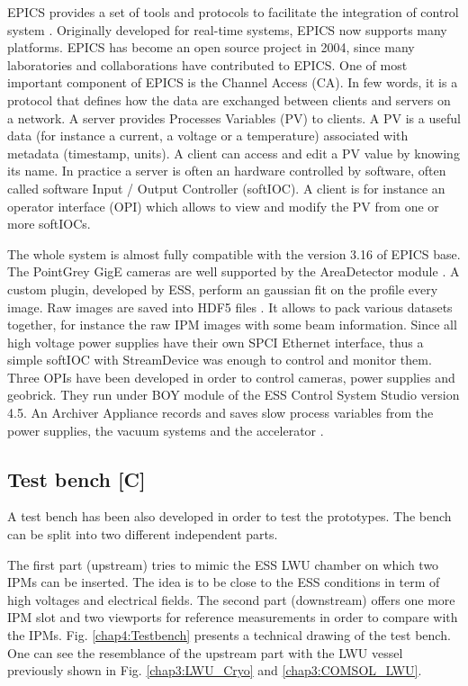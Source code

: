 \begin{refsection}
  EPICS provides a set of tools and protocols to facilitate the integration of control system \cite{epics2019}. Originally developed for real-time systems, EPICS now supports many platforms. EPICS has become an open source project in 2004, since many laboratories and collaborations have contributed to EPICS.
  One of most important component of EPICS is the Channel Access (CA). In few words, it is a protocol that defines how the data are exchanged between clients and servers on a network. A server provides Processes Variables (PV) to clients. A PV is a useful data (for instance a current, a voltage or a temperature) associated with metadata (timestamp, units). A client can access and edit a PV value by knowing its name. In practice a server is often an hardware controlled by software, often called software Input / Output Controller (softIOC). A client is for instance an operator interface (OPI) which allows to view and modify the PV from one or more softIOCs.

  The whole system is almost fully compatible with the version 3.16 of EPICS base. The PointGrey GigE cameras are well supported by the AreaDetector module \cite{ad2019}. A custom plugin, developed by ESS, perform an gaussian fit on the profile every image. Raw images are saved into HDF5 files \cite{hdf5}. It allows to pack  various datasets together, for instance the raw IPM images with some beam information.
  Since all high voltage power supplies have their own SPCI Ethernet interface, thus a simple softIOC with StreamDevice\cite{streamdevice2019} was enough to control and monitor them.
  Three OPIs have been developed in order to control cameras, power supplies and geobrick. They run under BOY module of the ESS Control System Studio version 4.5. An Archiver Appliance records and saves slow process variables from the power supplies, the vacuum systems and the accelerator \cite{archiver2019}.

  

  \subsection{Test bench [C]}
  A test bench has been also developed in order to test the prototypes. The bench can be split into two different independent parts.

  The first part (upstream) tries to mimic the ESS LWU chamber on which two IPMs can be inserted. The idea is to be close to the ESS conditions in term of high voltages and electrical fields. The second part (downstream) offers one more IPM slot and two viewports for reference measurements in order to compare with the IPMs. Fig. \ref{chap4:Testbench} presents a technical drawing of the test bench. One can see the resemblance of the upstream part with the LWU vessel previously shown in Fig. \ref{chap3:LWU_Cryo} and \ref{chap3:COMSOL_LWU}.



\end{refsection}
